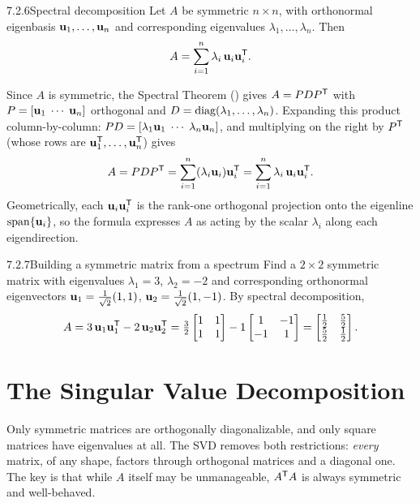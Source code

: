 \begin{thms}{7.2.6}{Spectral decomposition}
Let $A$ be symmetric $n\times n$, with orthonormal eigenbasis $\mathbf{u}_1,\dots,\mathbf{u}_n$ and corresponding eigenvalues $\lambda_1,\dots,\lambda_n$. Then
\[
A=\sum_{i=1}^n\lambda_i\,\mathbf{u}_i\mathbf{u}_i^{\mathsf{T}}.
\]
\end{thms}

\begin{prf}
Since $A$ is symmetric, the Spectral Theorem () gives $A=PDP^{\mathsf{T}}$ with $P=[\mathbf{u}_1\;\cdots\;\mathbf{u}_n]$ orthogonal and $D=\operatorname{diag}(\lambda_1,\dots,\lambda_n)$.
Expanding this product column-by-column: $PD=[\lambda_1\mathbf{u}_1\;\cdots\;\lambda_n\mathbf{u}_n]$, and multiplying on the right by $P^{\mathsf{T}}$ (whose rows are $\mathbf{u}_1^{\mathsf{T}},\dots,\mathbf{u}_n^{\mathsf{T}}$) gives
\[
A=PDP^{\mathsf{T}}=\sum_{i=1}^n(\lambda_i\mathbf{u}_i)\mathbf{u}_i^{\mathsf{T}}=\sum_{i=1}^n\lambda_i\,\mathbf{u}_i\mathbf{u}_i^{\mathsf{T}}.
\]
Geometrically, each $\mathbf{u}_i\mathbf{u}_i^{\mathsf{T}}$ is the rank-one orthogonal projection onto the eigenline $\operatorname{span}\{\mathbf{u}_i\}$, so the formula expresses $A$ as acting by the scalar $\lambda_i$ along each eigendirection.
\end{prf}

\begin{exmp}{7.2.7}{Building a symmetric matrix from a spectrum}
Find a $2\times2$ symmetric matrix with eigenvalues $\lambda_1=3$, $\lambda_2=-2$ and corresponding orthonormal eigenvectors $\mathbf{u}_1=\tfrac{1}{\sqrt2}(1,1)$, $\mathbf{u}_2=\tfrac{1}{\sqrt2}(1,-1)$. By spectral decomposition,
\[
A=3\,\mathbf{u}_1\mathbf{u}_1^{\mathsf{T}}-2\,\mathbf{u}_2\mathbf{u}_2^{\mathsf{T}}=\tfrac32\begin{bmatrix}1&1\\1&1\end{bmatrix}-1\begin{bmatrix}1&-1\\-1&1\end{bmatrix}=\begin{bmatrix}\tfrac12&\tfrac52\\\tfrac52&\tfrac12\end{bmatrix}.
\]
\end{exmp}

\section{The Singular Value Decomposition}
\label{sec:7.3}

Only symmetric matrices are orthogonally diagonalizable, and only square matrices have eigenvalues at all. The SVD removes both restrictions: \emph{every} matrix, of any shape, factors through orthogonal matrices and a diagonal one. The key is that while $A$ itself may be unmanageable, $A^{\mathsf{T}} A$ is always symmetric and well-behaved.

